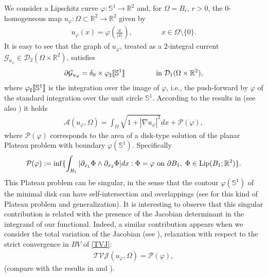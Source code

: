 \documentclass[a4paper,11pt]{article}
\numberwithin{equation}{section}
\newcommand{\jump}[1]{\text{{\rm \textlbrackdbl}}{#1}\text{{\rm \textrbrackdbl}}}
\newcommand{\Om}{\Omega}
\newcommand{\R}{\mathbb{R}}
\begin{document}
We consider a Lipschitz curve $\varphi:\mathbb S^1\rightarrow \R^2$ and, for $\Om=B_r$, $r>0$, the $0$-homogeneous map $u_\varphi:\Om\subset\R^2\rightarrow \R^2$ given by
\begin{align}\label{omomap}
u_\varphi(x)=\varphi(\frac{x}{|x|}),\qquad \qquad x\in \Om\setminus \{0\}.
\end{align}
It is easy to see that the graph of $u_\varphi$, treated as a $2$-integral current  $\mathcal G_{u_\varphi}\in \mathcal D_2(\Om\times \R^2)$, satisfies
\begin{align*}
\partial {\mathcal G}_{u_\varphi}=\delta_0\times \varphi_\sharp\jump{\mathbb S^1}\qquad \qquad \text{ in }\mathcal D_1(\Om\times\R^2),
\end{align*}
where $\varphi_\sharp\jump{\mathbb S^1}$ is the integration over the image of $\varphi$, i.e., the push-forward by $\varphi$ of the standard integration over the unit circle $\mathbb S^1$.
According to the results in \cite{BCS} (see also \cite{C}) it holds
\begin{align}\label{sing_plateau}
\mathcal A(u_\varphi,\Om)=\int_\Om \sqrt{1+|\nabla u_\varphi|^2}dx+\mathcal P(\varphi),
\end{align}
where $\mathcal P(\varphi)$ corresponds to the area of a disk-type solution of the planar Plateau problem with boundary $\varphi(\mathbb S^1)$. Specifically
\begin{align}
\mathcal P(\varphi):=\inf\{\int_{B_1}|\partial_{x_1}\Phi\wedge \partial_{x_2}\Phi| dx:\Phi=\varphi\text{ on }\partial B_1,\;\Phi\in \text{{\rm Lip}}(B_1;\R^2)\}.
\end{align}
This Plateau problem can be singular, in the sense that the contour $\varphi(\mathbb S^1)$ of the minimal disk can have self-intersection and overlappings (see \cite{Hass:91,CF,Creutz:20,CS} for this kind of Plateau problem and generalization). It is interesting to observe that this singular contribution is related with the presence of the Jacobian determinant in the integrand of our functional. Indeed, a similar contribution appears when we consider the total variation of the Jacobian (see \cite{BCS,C}), relaxation with respect to the strict convergence in $BV$ of \eqref{TVJ}:
\begin{align}
\mathcal{TVJ}(u_\varphi,\Om)=\mathcal P(\varphi),
\end{align}
 (compare with the results in \cite{Paol} and \cite{DP}).
\end{document}
